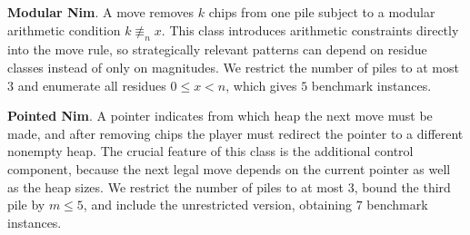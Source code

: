 \documentclass[review]{elsarticle}
\newcommand{\set}[1]{\{ #1 \}}
\newcommand{\tuple}[1]{\langle {#1} \rangle}
\newcommand{\true}{\top}
\newcommand{\statevar}{\mathcal{X}}
\newcommand{\act}{\mathcal{A}}
\newcommand{\constraint}{\mathcal{C}}
\newcommand{\estate}{\mathcal{E}}
\newcommand{\pre}{\mathtt{pre}}
\newcommand{\eff}{\mathtt{eff}}
\newcommand{\nmodulo}{\not \equiv}
\begin{document}
{\color{red}\textbf{Modular Nim}. A move removes $k$ chips from one pile subject to a modular arithmetic condition $k \nmodulo_n x$.}
{\color{red}This class introduces arithmetic constraints directly into the move rule, so strategically relevant patterns can depend on residue classes instead of only on magnitudes.}
{\color{red}We restrict the number of piles to at most $3$ and enumerate all residues $0 \le x < n$, which gives $5$ benchmark instances.}

{\color{red}\textbf{Pointed Nim}. A pointer indicates from which heap the next move must be made, and after removing chips the player must redirect the pointer to a different nonempty heap.}
{\color{red}The crucial feature of this class is the additional control component, because the next legal move depends on the current pointer as well as the heap sizes.}
{\color{red}We restrict the number of piles to at most $3$, bound the third pile by $m \le 5$, and include the unrestricted version, obtaining $7$ benchmark instances.}
\end{document}
